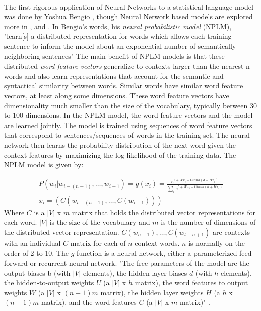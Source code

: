 \paragraph{}
The first rigorous application of Neural Networks to a statistical language model was done by Yoshua Bengio \cite{Bengio2003}, though Neural Network based models are explored more in \cite{Collobert2008}, and \cite{HuangEtAl2012} . In Bengio's words, his \emph{neural probabilistic model} (NPLM), "learn[s] a distributed representation for words which allows each training sentence to inform the model about an exponential number of semantically neighboring sentences" \cite[pg. 1137]{Bengio2003} The main benefit of NPLM models is that these distributed \emph{word feature vectors} generalize to contexts larger than the nearest n-words and also learn representations that account for the semantic and syntactical similarity between words. Similar words have similar word feature vectors, at least along some dimensions. These word feature vectors have dimensionality much smaller than the size of the vocabulary, typically between 30 to 100 dimensions. In the NPLM model, the word feature vectors and the model are learned jointly. The model is trained using sequences of word feature vectors that correspond to sentences/sequences of words in the training set. The neural network then learns the probability distribution of the next word given the context features by maximizing the log-likelihood of the training data. 
The NPLM model is given by:

\begin{align}
P(w_i | w_{i-(n-1)},\dots, w_{i-1}) = g(x_i) = \frac {e^{b+Wx_i+Utanh(d+Hx_i)}} {\sum_i e^{b+Wx_i+Utanh(d+Hx_i)}} \label{FFNN}
\\x_i=\left(C(w_{i-(n-1)}, \dots, C(w_{i-1}) )\right)
\end{align}
Where $C$ is a $|V|$ x $m$ matrix that holds the distributed vector representations for each word.  $|V|$ is the size of the vocabulary and $m$ is the number of dimensions of the distributed vector representation. $C(w_{n-1}), \dots, C(w_{t-n+1})$ are contexts with an individual $C$ matrix for each of $n$ context words. $n$ is normally on the order of 2 to 10. The $g$ function is a neural network, either a parameterized feed-forward or recurrent neural network. 
"The free parameters of the model are the output biases b (with $|V|$ elements), the hidden layer biases $d$ (with $h$ elements), the hidden-to-output weights $U$ (a $|V|$ x $h$ matrix), the word features to output weights $W$ (a $|V|$ x $(n-1)m$ matrix), the hidden layer weights $H$ (a $h$ x $(n-1)m$ matrix), and the word features $C$ (a $|V|$ x $m$ matrix)" \cite[pg. 1143]{Bengio2003}.
